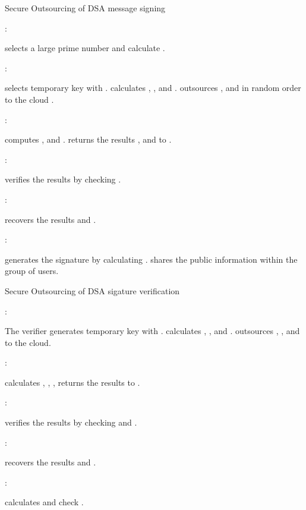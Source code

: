 \documentclass[english,draftcls,onecolumn,11pt]{IEEEtran}
\theoremstyle{definition}
\theoremstyle{plain}
\theoremstyle{plain}
\theoremstyle{definition}
\begin{document}
\begin{algorithm}[h] 
\caption{Secure Outsourcing of DSA message signing\label{alg:SecureDSA-Sign}}

\smallskip 
:  
\begin{algorithmic}[1] 
\STATE  selects a large prime number  and calculate . 
\end{algorithmic} 

\smallskip 
:  
\begin{algorithmic}[1] 
\STATE  selects temporary key  with . 
\STATE  calculates , ,  and .
\STATE  outsources ,  and  in random order to the cloud .
\end{algorithmic} 

\smallskip
:
\begin{algorithmic}[1] 
\STATE  computes ,  and .
\STATE  returns the results ,  and  to .
\end{algorithmic} 

\smallskip
:
\begin{algorithmic}[1] 
\STATE  verifies the results by checking .
\end{algorithmic} 

\smallskip
:
\begin{algorithmic}[1] 
\STATE  recovers the results  and .
\end{algorithmic} 

\smallskip
: 
\begin{algorithmic}[1] 
\STATE  generates the signature  by calculating . 
\STATE  shares the public information  within the group of users.
\end{algorithmic}
\end{algorithm}



\begin{algorithm}[h] 
\caption{Secure Outsourcing of DSA sigature verification\label{alg:SecureDSA-Verification}}

\smallskip 
:  
\begin{algorithmic}[1] 
\STATE The verifier  generates temporary key  with .
\STATE  calculates , ,  and . 
\STATE  outsources , ,  and  to the
cloud.
\end{algorithmic} 

\smallskip
:
\begin{algorithmic}[1] 
\STATE  calculates , , ,  
\STATE  returns the results  to .
\end{algorithmic} 

\smallskip
:
\begin{algorithmic}[1] 
\STATE  verifies the results by checking  and .
\end{algorithmic} 

\smallskip
:
\begin{algorithmic}[1] 
\STATE  recovers the results  and .
\end{algorithmic} 

\smallskip
: 
\begin{algorithmic}[1] 
\STATE  calculates  and check .
\end{algorithmic}
\end{algorithm}
\end{document}
